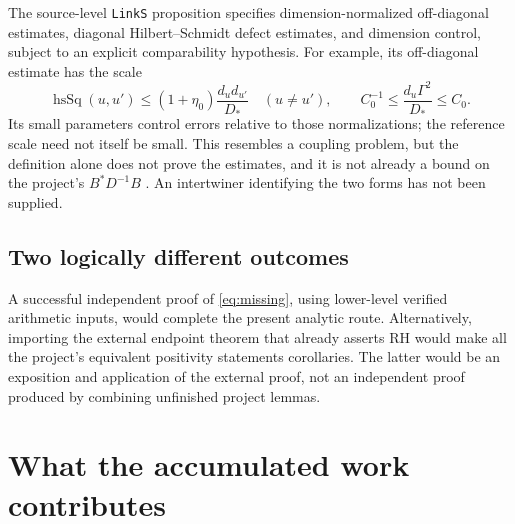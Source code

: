 \documentclass[11pt,letterpaper]{article}
\theoremstyle{definition}
\theoremstyle{remark}
\numberwithin{equation}{section}
\begin{document}
The source-level \texttt{LinkS} proposition specifies dimension-normalized off-diagonal estimates, diagonal Hilbert--Schmidt defect estimates, and dimension control, subject to an explicit comparability hypothesis. For example, its off-diagonal estimate has the scale
\[
 \operatorname{hsSq}(u,u')\le(1+\eta_0)\frac{d_ud_{u'}}{D_*}\quad(u\ne u'),
 \qquad C_0^{-1}\le\frac{d_u\Gamma^2}{D_*}\le C_0.
\]
Its small parameters control errors relative to those normalizations; the reference scale need not itself be small. This resembles a coupling problem, but the definition alone does not prove the estimates, and it is not already a bound on the project's $B^*D^{-1}B$ \cite{externalinputs}. An intertwiner identifying the two forms has not been supplied.

\subsection{Two logically different outcomes}
A successful independent proof of \eqref{eq:missing}, using lower-level verified arithmetic inputs, would complete the present analytic route. Alternatively, importing the external endpoint theorem that already asserts RH would make all the project's equivalent positivity statements corollaries. The latter would be an exposition and application of the external proof, not an independent proof produced by combining unfinished project lemmas.

\section{What the accumulated work contributes}
\end{document}
